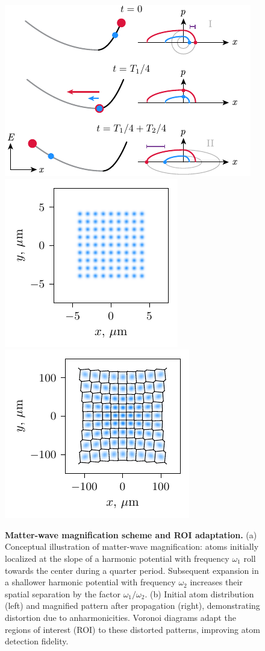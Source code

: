 \begin{figure}
    \centering
    \includegraphics{fig-ai/mwm-scheme.pdf}
    \includegraphics{fig-py/mwm-1.pdf}
    \includegraphics{fig-py/mwm-2.pdf}
    \caption{
    \textbf{Matter-wave magnification scheme and ROI adaptation.}
    (a) Conceptual illustration of matter-wave magnification: atoms initially localized at the slope of a harmonic potential with frequency $\omega_1$ roll towards the center during a quarter period. Subsequent expansion in a shallower harmonic potential with frequency $\omega_2$ increases their spatial separation by the factor $\omega_1/\omega_2$.
    (b) Initial atom distribution (left) and magnified pattern after propagation (right), demonstrating distortion due to anharmonicities. Voronoi diagrams adapt the regions of interest (ROI) to these distorted patterns, improving atom detection fidelity.
    }
    \label{fig:mwm}
\end{figure}

